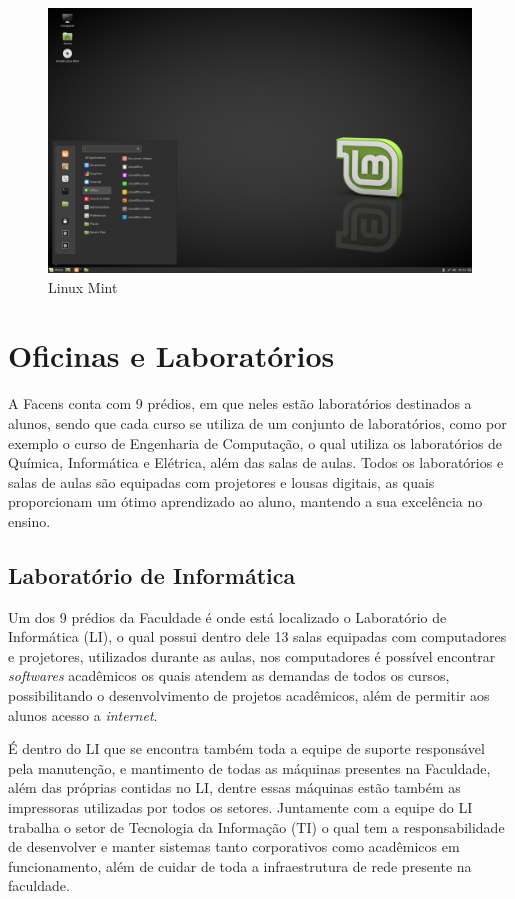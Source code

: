 \documentclass[
	12pt,				%
	oneside,			%
	a4paper,			%
	chapter=TITLE,		%
	section=TITLE,		%
	sumario=tradicional %
	english,			%
	french,				%
	spanish,			%
	brazil				%
	]{abntex2}
\begin{document}
\begin{figure}[htb]
	\caption{\label{fig:linux} Linux Mint}
	\begin{center}
		\includegraphics[scale=0.3]{linux}
	\end{center}
\end{figure}


\section{Oficinas e Laboratórios}
\label{sec:oficlabs}
A Facens conta com 9 prédios, em que neles estão laboratórios destinados a alunos, sendo que cada curso se utiliza de um conjunto de laboratórios, como por exemplo o curso de Engenharia de Computação, o qual utiliza os laboratórios de Química, Informática e Elétrica, além das salas de aulas. Todos os laboratórios e salas de aulas são equipadas com projetores e lousas digitais, as quais proporcionam um ótimo aprendizado ao aluno, mantendo a sua excelência no ensino.

\subsection{Laboratório de Informática}
Um dos 9 prédios da Faculdade é onde está localizado o Laboratório de Informática (LI), o qual possui dentro dele 13 salas equipadas com computadores e projetores, utilizados durante as aulas, nos computadores é possível encontrar \textit{softwares} acadêmicos os quais atendem as demandas de todos os cursos, possibilitando o desenvolvimento de projetos acadêmicos, além de permitir aos alunos acesso a \textit{internet}.

É dentro do LI que se encontra também toda a equipe de suporte responsável pela manutenção, e mantimento de todas as máquinas presentes na Faculdade, além das próprias contidas no LI, dentre essas máquinas estão também as impressoras utilizadas por todos os setores. Juntamente com a equipe do LI trabalha o setor de Tecnologia da Informação (TI) o qual tem a responsabilidade de desenvolver e manter sistemas tanto corporativos como acadêmicos em funcionamento, além de cuidar de toda a infraestrutura de rede presente na faculdade.
\end{document}
